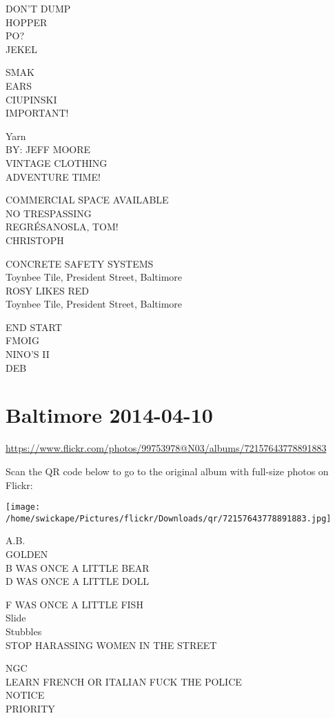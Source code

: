 \documentclass[10pt,letterpaper]{article}
\begin{document}
DON'T DUMP\\
HOPPER\\
PO?\\
JEKEL

SMAK\\
EARS\\
CIUPINSKI\\
IMPORTANT!

Yarn\\
BY: JEFF MOORE\\
VINTAGE CLOTHING\\
ADVENTURE TIME!

COMMERCIAL SPACE AVAILABLE\\
NO TRESPASSING\\
REGRÉSANOSLA, TOM!\\
CHRISTOPH

CONCRETE SAFETY SYSTEMS\\
Toynbee Tile, President Street, Baltimore\\
ROSY LIKES RED\\
Toynbee Tile, President Street, Baltimore

END START\\
FMOIG\\
NINO'S II\\
DEB


\section*{Baltimore 2014-04-10}

\url{https://www.flickr.com/photos/99753978@N03/albums/72157643778891883}

Scan the QR code below to go to the original album with full-size photos on Flickr:

\texttt{[image: /home/swickape/Pictures/flickr/Downloads/qr/72157643778891883.jpg]}


A.B.\\
GOLDEN\\
B WAS ONCE A LITTLE BEAR\\
D WAS ONCE A LITTLE DOLL

F WAS ONCE A LITTLE FISH\\
Slide\\
Stubbles\\
STOP HARASSING WOMEN IN THE STREET

NGC\\
LEARN FRENCH OR ITALIAN FUCK THE POLICE\\
NOTICE\\
PRIORITY
\end{document}
